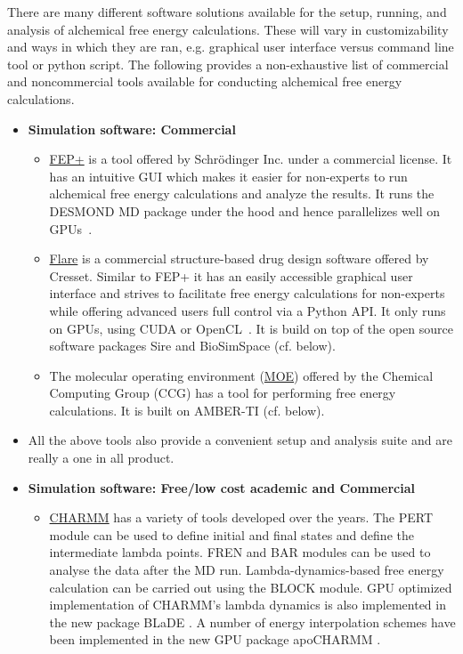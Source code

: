 \documentclass[9pt,bestpractices]{livecoms}
\begin{document}
\label{sec:software}
There are many different software solutions available for the setup, running, and analysis of alchemical free energy calculations. These will vary in customizability and ways in which they are ran, e.g. graphical user interface versus command line tool or python script. The following provides a non-exhaustive list of commercial and noncommercial tools available for conducting alchemical free energy calculations. 
\begin{itemize}

\item [] \textbf{Simulation software: Commercial}
   \begin{itemize}
    \item \href{https://www.schrodinger.com/fep}{FEP+} is a tool offered by Schr\"{o}dinger Inc. under a commercial license. It has an intuitive GUI which makes it easier for non-experts to run alchemical free energy calculations and analyze the results. It runs the DESMOND MD package under the hood and hence parallelizes well on GPUs~\cite{wang2015accurate}. 
    \item \href{https://www.cresset-group.com/software/flare/}{Flare} is a commercial structure-based drug design software offered by Cresset. Similar to FEP+ it has an easily accessible graphical user interface and strives to facilitate free energy calculations for non-experts while offering advanced users full control via a Python API. It only runs on GPUs, using CUDA or OpenCL~\cite{kuhn2020assessment}. It is build on top of the open source software packages Sire and BioSimSpace (cf. below).
    \item The molecular operating environment (\href{https://www.chemcomp.com/Products.htm}{MOE}) offered by the Chemical Computing Group (CCG) has a tool for performing free energy calculations. It is built on AMBER-TI (cf. below).
    \end{itemize}
    \item[]All the above tools also provide a convenient setup and analysis suite and are really a one in all product. \newline
\item [] \textbf{Simulation software: Free/low cost academic and Commercial}
	\begin{itemize}
	\item \href{https://www.charmm.org/}{CHARMM} has a variety of tools developed over the years. The PERT module can be used to define initial and final states and define the intermediate lambda points. FREN and BAR modules can be used to analyse the data after the MD run. Lambda-dynamics-based free energy calculation can be carried out using the BLOCK module. GPU optimized implementation of CHARMM's lambda dynamics is also implemented in the new package BLaDE \cite{hayes2021blade}. A number of energy interpolation schemes have been implemented in the new GPU package apoCHARMM \cite{prasad2025apocharmm}.     

\end{itemize}
\end{itemize}
\end{document}
